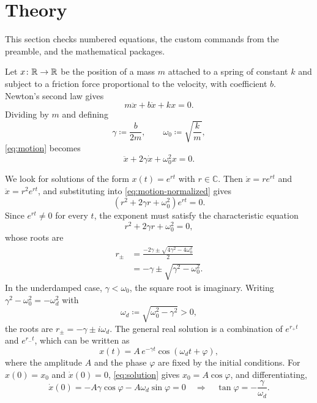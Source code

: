 \section{Theory}
\label{sec:theory}

This section checks numbered equations, the custom commands from the preamble, and the mathematical packages.

Let $x\colon \mathbb{R} \to \mathbb{R}$ be the position of a mass $m$ attached to a spring of constant $k$ and subject to a friction force proportional to the velocity, with coefficient $b$.
Newton's second law gives
\begin{equation}
   m\ddot{x} + b\dot{x} + kx = 0 .
   \label{eq:motion}
\end{equation}
Dividing by $m$ and defining
\begin{equation}
   \gamma \coloneqq \frac{b}{2m}, \qquad \omega_0 \coloneqq \sqrt{\frac{k}{m}},
   \label{eq:definitions}
\end{equation}
\cref{eq:motion} becomes
\begin{equation}
   \ddot{x} + 2\gamma\dot{x} + \omega_0^2 x = 0 .
   \label{eq:motion-normalized}
\end{equation}

We look for solutions of the form $x(t) = e^{rt}$ with $r \in \mathbb{C}$.
Then $\dot{x} = r e^{rt}$ and $\ddot{x} = r^2 e^{rt}$, and substituting into \cref{eq:motion-normalized} gives
\begin{equation}
   \left(r^2 + 2\gamma r + \omega_0^2\right) e^{rt} = 0 .
\end{equation}
Since $e^{rt} \neq 0$ for every $t$, the exponent must satisfy the characteristic equation
\begin{equation}
   r^2 + 2\gamma r + \omega_0^2 = 0 ,
   \label{eq:characteristic}
\end{equation}
whose roots are
\begin{align}
   r_\pm &= \frac{-2\gamma \pm \sqrt{4\gamma^2 - 4\omega_0^2}}{2} \nonumber \\
         &= -\gamma \pm \sqrt{\gamma^2 - \omega_0^2} .
\end{align}
In the underdamped case, $\gamma < \omega_0$, the square root is imaginary.
Writing $\gamma^2 - \omega_0^2 = -\omega_d^2$ with
\begin{equation}
   \omega_d \coloneqq \sqrt{\omega_0^2 - \gamma^2} > 0 ,
   \label{eq:omega-d}
\end{equation}
the roots are $r_\pm = -\gamma \pm i\omega_d$.
The general real solution is a combination of $e^{r_+ t}$ and $e^{r_- t}$, which can be written as
\begin{equation}
   x(t) = A\, e^{-\gamma t} \cos\left(\omega_d t + \varphi\right),
   \label{eq:solution}
\end{equation}
where the amplitude $A$ and the phase $\varphi$ are fixed by the initial conditions.
For $x(0) = x_0$ and $\dot{x}(0) = 0$, \cref{eq:solution} gives $x_0 = A\cos\varphi$, and differentiating,
\begin{equation}
   \dot{x}(0) = -A\gamma\cos\varphi - A\omega_d\sin\varphi = 0
   \quad\Longrightarrow\quad
   \tan\varphi = -\frac{\gamma}{\omega_d} .
\end{equation}

